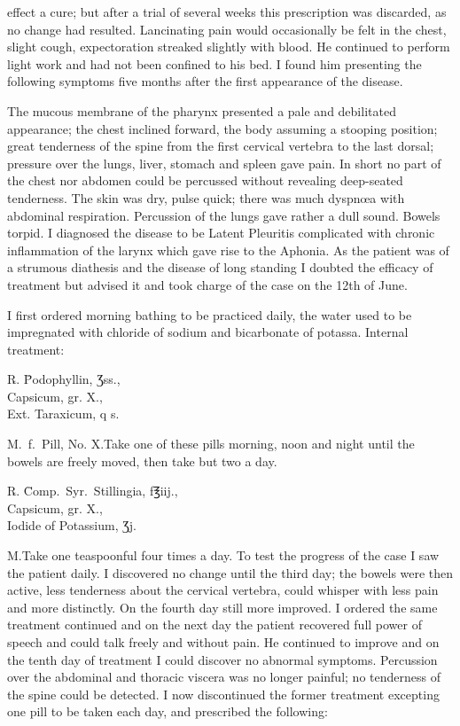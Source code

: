 effect a cure; but after a trial of several weeks this prescription was
discarded, as no change had resulted. Lancinating pain would occasionally
be felt in the chest, slight cough, expectoration streaked slightly
with blood. He continued to perform light work and had not been
confined to his bed. I found him presenting the following symptoms
five months after the first appearance of the disease.

The mucous membrane of the pharynx presented a pale and debilitated
appearance; the chest inclined forward, the body assuming a
stooping position; great tenderness of the spine from the first cervical
vertebra to the last dorsal; pressure over the lungs, liver, stomach
and spleen gave pain. In short no part of the chest nor abdomen
could be percussed without revealing deep-seated tenderness. The
skin was dry, pulse quick; there was much dyspnœa with abdominal
respiration. Percussion of the lungs gave rather a dull sound. Bowels
torpid. I diagnosed the disease to be Latent Pleuritis complicated
with chronic inflammation of the larynx which gave rise to the Aphonia.
As the patient was of a strumous diathesis and the disease of long standing
I doubted the efficacy of treatment but advised it and took charge
of the case on the 12th of June.

I first ordered morning bathing to be practiced daily, the water used
to be impregnated with chloride of sodium and bicarbonate of potassa.
Internal treatment:

\begin{center}
\begin{tabbing}
  \textsf{℞}. \= Podophyllin, \textsf{Ʒ}ss., \\
    \> Capsicum, gr. X., \\
    \> Ext. Taraxicum, q s.
\end{tabbing}
\end{center}
M.\ f.\ Pill, No. X.\quad{}Take one of these pills morning, noon and night
until the bowels are freely moved, then take but two a day.
\begin{center}
\begin{tabbing}
  \textsf{℞}. \= Comp.\ Syr.\ Stillingia, f\textsf{℥}iij., \\
    \> Capsicum, gr. X., \\
    \> Iodide of Potassium, \textsf{Ʒ}j.
\end{tabbing}
\end{center}
M.\quad{}Take one teaspoonful four times a day. To test the progress of
the case I saw the patient daily. I discovered no change until the third
day; the bowels were then active, less tenderness about the cervical
vertebra, could whisper with less pain and more distinctly. On the
fourth day still more improved. I ordered the same treatment continued
and on the next day the patient recovered full power of speech and could
talk freely and without pain. He continued to improve and on the tenth
day of treatment I could discover no abnormal symptoms. Percussion
over the abdominal and thoracic viscera was no longer painful; no tenderness
of the spine could be detected. I now discontinued the former
treatment excepting one pill to be taken each day, and prescribed the
following:\endinput
